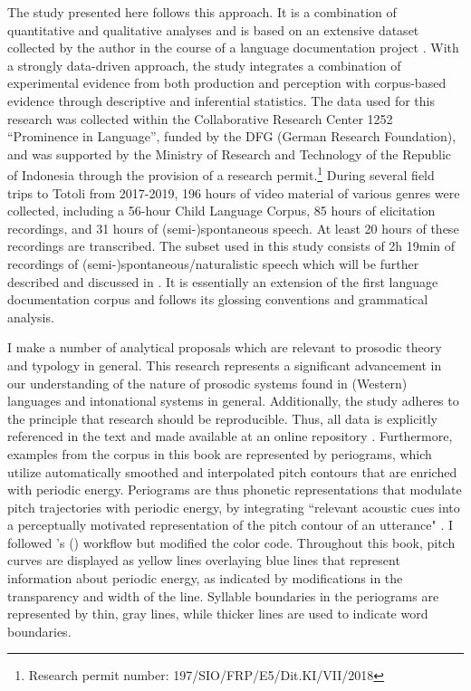 The study presented here follows this approach. It is a combination of quantitative and qualitative analyses and is based on an extensive dataset collected by the author in the course of a language documentation project   \citep{TotoliLAC}.  With a strongly data-driven approach, the study integrates a combination of experimental evidence from both production  and perception  with corpus-based evidence through descriptive and inferential statistics. 
The data used for this research was collected within the Collaborative Research Center 1252 “Prominence in Language”, funded by the DFG (German Research Foundation), and was supported by the Ministry of Research and Technology of the Republic of Indonesia through the provision of a research permit.\footnote{Research permit number: 197/SIO/FRP/E5/Dit.KI/VII/2018}  During several field trips to Totoli from 2017-2019, 196 hours of video material of various genres were collected, including a 56-hour Child Language Corpus, 85 hours of elicitation recordings, and 31 hours of \mbox{(semi-)}spontaneous speech. At least 20 hours of these recordings are transcribed.   The subset used in this study consists of 2h 19min  of recordings of \mbox{(semi-)}spontaneous\slash naturalistic speech which will be further described and discussed in  .  It is essentially an extension of the first language documentation corpus \citep{Totoli_Dobes} and follows its glossing conventions and grammatical analysis. 

I make a number of analytical proposals which are relevant to prosodic theory and typology in general. This research represents a significant advancement in our understanding of the nature of prosodic systems found in (Western)  languages and intonational systems in general. Additionally, the study adheres to the principle that research should be reproducible.  Thus, all data is explicitly referenced in the text and made available at an online repository  \citep{TotoliLAC}. Furthermore, examples from the corpus in this book are represented by periograms, which utilize automatically smoothed and interpolated pitch contours that are enriched with periodic energy. Periograms are thus  phonetic representations that modulate pitch trajectories with periodic energy, by integrating ``relevant acoustic cues into a perceptually motivated representation of the pitch contour of an utterance" \citep[807]{albert2018using}. I followed  \citeauthor{Albert_cangemi_Ellison_Grice_2022}'s  (\citeyear{Albert_cangemi_Ellison_Grice_2022}) workflow but modified the color code.  Throughout this book, pitch curves are displayed as yellow lines overlaying  blue lines that represent information about periodic energy, as indicated by modifications in the transparency and width of the line. Syllable boundaries in the periograms are represented by thin, gray lines, while thicker lines are used to indicate word boundaries. 





